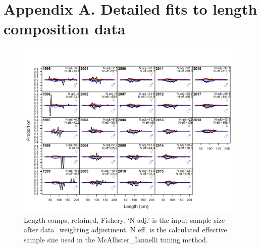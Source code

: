 \documentclass[12pt,]{article}
\begin{document}
\newpage

\FloatBarrier

\newpage

\FloatBarrier
\newpage

\hypertarget{appendix-a.-detailed-fits-to-length-composition-data}{%
\section*{Appendix A. Detailed fits to length composition
data}\label{appendix-a.-detailed-fits-to-length-composition-data}}

\renewcommand{\thepage}{A-\arabic{page}}
\renewcommand{\thefigure}{A\arabic{figure}}
\setcounter{page}{1}

\begin{figure}
\centering
\includegraphics{./r4ss/plots_mod1/comp_lenfit_flt1mkt2.png}
\caption{Length comps, retained, Fishery. `N adj.' is the input sample
size after data\_weighting adjustment. N eff. is the calculated
effective sample size used in the McAllister\_Iannelli tuning method.
\label{fig:mod1_1_comp_lenfit_flt1mkt2}}
\end{figure}
\end{document}
